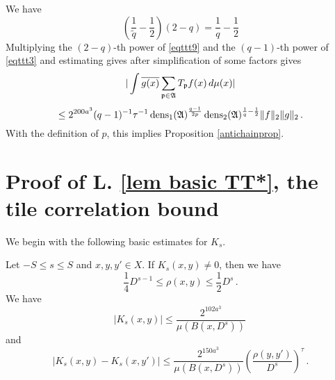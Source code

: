 We have
\begin{equation}
    \left (\frac 1{\tilde{q}} -\frac 12\right) (2-q)= \frac 1q -\frac 12
\end{equation}
Multiplying  the $(2-q)$-th power of  \eqref{eqttt9} and the $(q-1)$-th power of \eqref{eqttt3}
and estimating gives after simplification of some factors gives
\begin{equation}\label{eqttt8}
  |\int \overline{g(x)} \sum_{\mathfrak p \in \mathfrak{A}} T_{\mathfrak p} f(x)\, d\mu(x)|
  \end{equation}
  \begin{equation}
      \le  2^{200a^3}({q}-1)^{-1} \tau^{-1}\operatorname{\operatorname{dens}}_1(\mathfrak{A})^{\frac {q-1}{2p}}\operatorname{\operatorname{dens}}_2(\mathfrak{A})^{\frac 1{q}-\frac 12}  \|f\|_2\|g\|_2\, .
  \end{equation}
 With the definition of $p$, this  implies
Proposition \ref{antichainprop}.


\section{Proof of L. \ref{lem basic TT*}, the tile correlation bound }\label{sec tile operator}
We begin with the following basic estimates for $K_s$.
\begin{lemma}
Let $-S\le s\le S$ and $x,y,y'\in X$.
If $K_s(x,y)\neq 0$, then we have
\begin{equation}\label{supp Ks}
  \frac{1}{4} D^{s-1} \leq \rho(x,y) \leq \frac{1}{2} D^s\, .
\end{equation}
We have
\begin{equation}
   \label{eq Ks size}
    |K_s(x,y)|\le \frac{2^{102 a^3}}{\mu(B(x, D^{s}))}\,
\end{equation}
and \begin{equation}
    \label{eq Ks smooth}
    |K_s(x,y)-K_s(x, y')|\le \frac{2^{150a^3}}{\mu(B(x, D^{s}))}
    \left(\frac{ \rho(y,y')}{D^s}\right)^{\tau}\,.
\end{equation}
\end{lemma}

